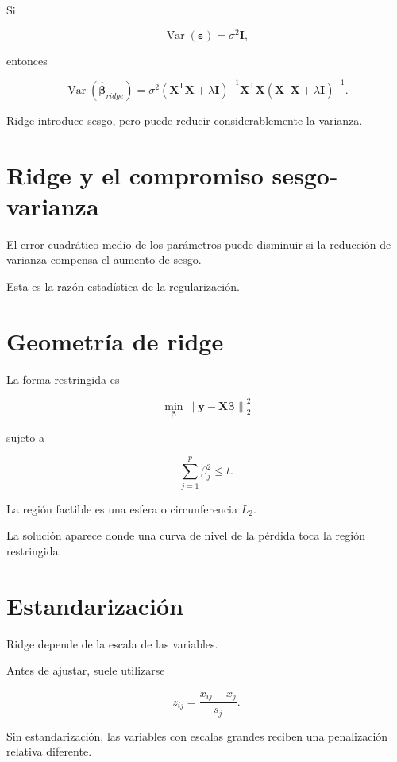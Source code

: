 \documentclass[
  spanish,
  11pt,
  letterpaper,
  DIV=11,
  numbers=noendperiod]{scrreprt}
\theoremstyle{definition}
\theoremstyle{plain}
\theoremstyle{definition}
\theoremstyle{remark}
\begin{document}
Si

\[
\operatorname{Var}(\boldsymbol{\varepsilon})
=
\sigma^2\mathbf{I},
\]

entonces

\[
\operatorname{Var}
(
\widehat{\boldsymbol{\beta}}_{ridge}
)
=
\sigma^2
\left(
\mathbf{X}^{\mathsf T}\mathbf{X}
+
\lambda\mathbf{I}
\right)^{-1}
\mathbf{X}^{\mathsf T}\mathbf{X}
\left(
\mathbf{X}^{\mathsf T}\mathbf{X}
+
\lambda\mathbf{I}
\right)^{-1}.
\]

Ridge introduce sesgo, pero puede reducir considerablemente la varianza.

\section{Ridge y el compromiso
sesgo-varianza}\label{ridge-y-el-compromiso-sesgo-varianza}

El error cuadrático medio de los parámetros puede disminuir si la
reducción de varianza compensa el aumento de sesgo.

Esta es la razón estadística de la regularización.

\section{Geometría de ridge}\label{geometruxeda-de-ridge}

La forma restringida es

\[
\min_{\boldsymbol{\beta}}
\left\|
\mathbf{y}
-
\mathbf{X}\boldsymbol{\beta}
\right\|_2^2
\]

sujeto a

\[
\sum_{j=1}^{p}
\beta_j^2
\leq
t.
\]

La región factible es una esfera o circunferencia \(L_2\).

La solución aparece donde una curva de nivel de la pérdida toca la
región restringida.

\section{Estandarización}\label{estandarizaciuxf3n}

Ridge depende de la escala de las variables.

Antes de ajustar, suele utilizarse

\[
z_{ij}
=
\frac{
x_{ij}-\overline{x}_j
}{
s_j
}.
\]

Sin estandarización, las variables con escalas grandes reciben una
penalización relativa diferente.
\end{document}
